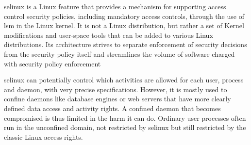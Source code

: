 \ac{selinux} is a Linux feature that provides a mechanism for supporting access control security policies, including mandatory access controls, through the use of \ac{lsm} in the Linux kernel.
It is not a Linux distribution, but rather a set of Kernel modifications and user-space tools that can be added to various Linux distributions.
Its architecture strives to separate enforcement of security decisions from the security policy itself and streamlines the volume of software charged with security policy enforcement 

\ac{selinux} can potentially control which activities are allowed for each user, process and daemon, with very precise specifications.
However, it is mostly used to confine daemons like database engines or web servers that have more clearly defined data access and activity rights.
A confined daemon that becomes compromised is thus limited in the harm it can do.
Ordinary user processes often run in the unconfined domain, not restricted by \ac{selinux} but still restricted by the classic Linux access rights.
\cite{wiki:selinux}
